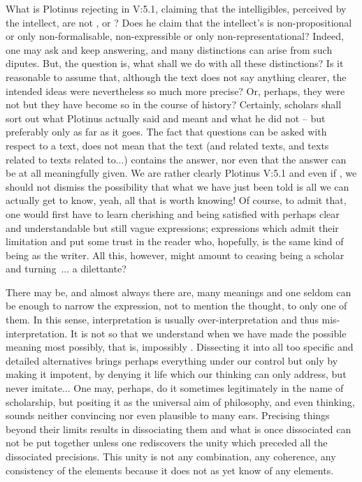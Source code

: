 What is Plotinus rejecting in V:5.1, claiming that the intelligibles, perceived by the
intellect, are not ,  or ? Does he
claim that the intellect's  is non-propositional or only
non-formalisable, non-expressible or only non-representational? Indeed, one may 
ask and keep answering, and many distinctions can arise from such diputes. But,
the question is, what shall we do with all these distinctions? Is it reasonable
to assume that, although the text does not say anything clearer, the intended
ideas were nevertheless so much more precise? Or, perhaps, they were not but
they have become so in the course of history?
Certainly, scholars shall sort out what Plotinus actually said
and meant and what he did not -- but preferably only as far as it goes. The fact
that questions can be asked with respect to a text, does not mean that the text
(and related texts, and texts related to texts related to...) contains the
answer, nor even that the answer can be at all 
meaningfully given. We are rather clearly
\citet{told that the Intellectual-Principle and
the Intellectual Objects are linked in a standing unity}{Plotinus}{ V:5.1} and
even if , we should not dismiss the
possibility that what we have just been told is all we can actually get to know,
yeah, all that is worth knowing! Of course, 
to admit that, one would first have to learn cherishing and being satisfied with
perhaps clear and understandable but still vague expressions; expressions which
admit their limitation and put some trust in the reader who, hopefully, is the
same kind of being as the writer. All this, however, might amount to ceasing being a
scholar and turning~... a dilettante? 


There may be, and almost always there are, many meanings and one seldom can be
 enough to narrow the expression, not to mention the thought, to
only one of them.  In this sense, interpretation is usually over-interpretation
and thus mis-interpretation. It is not so that we understand when we have made
the possible meaning most possibly, that is, impossibly . Dissecting
it into all too specific and detailed alternatives brings perhaps everything
under our control but only by making it impotent, by denying it life which our
thinking can only address, but never imitate... One may, perhaps, do it
sometimes legitimately in the name of scholarship, but positing it as the
universal aim of philosophy, and even thinking, sounds neither convincing nor
even plausible to many ears. Precising things beyond their limits results in
dissociating them and what is once dissociated can not be put together unless
one rediscovers the unity which preceded all the dissociated precisions. This
unity is not any combination, any coherence, any consistency of the elements
because it does not as yet know of any elements. 

